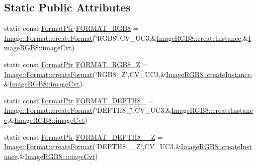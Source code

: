 \subsection*{Static Public Attributes}
\begin{DoxyCompactItemize}
\item 
static const \hyperlink{classcolorspaces_1_1_image_ab3978cc7acc2b5e855f8c715f09667d1}{Format\+Ptr} \hyperlink{classcolorspaces_1_1_image_r_g_b8_abb2bd76934dd71bb401db29cd5082b5c}{F\+O\+R\+M\+A\+T\+\_\+\+R\+G\+B8} = \hyperlink{classcolorspaces_1_1_image_1_1_format_ae79208f237b72cf596331ebcec2ff58b}{Image\+::\+Format\+::create\+Format}(\char`\"{}R\+G\+B8\char`\"{},C\+V\+\_\+U\+C3,\&\hyperlink{classcolorspaces_1_1_image_r_g_b8_ab71cd6e6837845cd0c43ac03e3a86297}{Image\+R\+G\+B8\+::create\+Instance},\&\hyperlink{classcolorspaces_1_1_image_r_g_b8_ac26f79bdedd29a4ab1ee6f9ac0abd928}{Image\+R\+G\+B8\+::image\+Cvt})
\item 
static const \hyperlink{classcolorspaces_1_1_image_ab3978cc7acc2b5e855f8c715f09667d1}{Format\+Ptr} \hyperlink{classcolorspaces_1_1_image_r_g_b8_a02a89815364677755b02998334820324}{F\+O\+R\+M\+A\+T\+\_\+\+R\+G\+B8\+\_\+Z} = \hyperlink{classcolorspaces_1_1_image_1_1_format_ae79208f237b72cf596331ebcec2ff58b}{Image\+::\+Format\+::create\+Format}(\char`\"{}R\+G\+B8\+\_\+Z\char`\"{},C\+V\+\_\+U\+C3,\&\hyperlink{classcolorspaces_1_1_image_r_g_b8_ab71cd6e6837845cd0c43ac03e3a86297}{Image\+R\+G\+B8\+::create\+Instance},\&\hyperlink{classcolorspaces_1_1_image_r_g_b8_ac26f79bdedd29a4ab1ee6f9ac0abd928}{Image\+R\+G\+B8\+::image\+Cvt})
\item 
static const \hyperlink{classcolorspaces_1_1_image_ab3978cc7acc2b5e855f8c715f09667d1}{Format\+Ptr} \hyperlink{classcolorspaces_1_1_image_r_g_b8_a9425bfababa3570fc70730c4ec76ae51}{F\+O\+R\+M\+A\+T\+\_\+\+D\+E\+P\+T\+H8\+\_} = \hyperlink{classcolorspaces_1_1_image_1_1_format_ae79208f237b72cf596331ebcec2ff58b}{Image\+::\+Format\+::create\+Format}(\char`\"{}D\+E\+P\+T\+H8\+\_\char`\"{},C\+V\+\_\+U\+C3,\&\hyperlink{classcolorspaces_1_1_image_r_g_b8_ab71cd6e6837845cd0c43ac03e3a86297}{Image\+R\+G\+B8\+::create\+Instance},\&\hyperlink{classcolorspaces_1_1_image_r_g_b8_ac26f79bdedd29a4ab1ee6f9ac0abd928}{Image\+R\+G\+B8\+::image\+Cvt})
\item 
static const \hyperlink{classcolorspaces_1_1_image_ab3978cc7acc2b5e855f8c715f09667d1}{Format\+Ptr} \hyperlink{classcolorspaces_1_1_image_r_g_b8_accd7299575ca7ba2e2c1f339c00fe102}{F\+O\+R\+M\+A\+T\+\_\+\+D\+E\+P\+T\+H8\+\_\+\_\+Z} = \hyperlink{classcolorspaces_1_1_image_1_1_format_ae79208f237b72cf596331ebcec2ff58b}{Image\+::\+Format\+::create\+Format}(\char`\"{}D\+E\+P\+T\+H8\+\_\+\_\+Z\char`\"{},C\+V\+\_\+U\+C3,\&\hyperlink{classcolorspaces_1_1_image_r_g_b8_ab71cd6e6837845cd0c43ac03e3a86297}{Image\+R\+G\+B8\+::create\+Instance},\&\hyperlink{classcolorspaces_1_1_image_r_g_b8_ac26f79bdedd29a4ab1ee6f9ac0abd928}{Image\+R\+G\+B8\+::image\+Cvt})
\end{DoxyCompactItemize}
